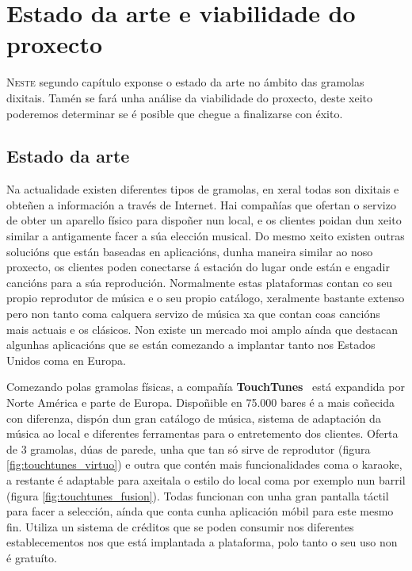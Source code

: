 \chapter{Estado da arte e viabilidade do proxecto}
\label{chap:arte_viabilidade}

\lettrine{N}{este} segundo capítulo exponse o estado da arte no ámbito das gramolas dixitais. Tamén se fará unha análise da viabilidade do proxecto, deste xeito poderemos determinar se é posible que chegue a finalizarse con éxito.

\section{Estado da arte}
\label{sec:estado_da_arte}
Na actualidade existen diferentes tipos de gramolas, en xeral todas son dixitais e obteñen a información a través de Internet. Hai compañías que ofertan o servizo de obter un aparello físico para dispoñer nun local, e os clientes poidan dun xeito similar a antigamente facer a súa elección musical. Do mesmo xeito existen outras solucións que están baseadas en aplicacións, dunha maneira similar ao noso proxecto, os clientes poden conectarse á estación do lugar onde están e engadir cancións para a súa reprodución. Normalmente estas plataformas contan co seu propio reprodutor de música e o seu propio catálogo, xeralmente bastante extenso pero non tanto coma calquera servizo de música xa que contan coas cancións mais actuais e os clásicos. Non existe un mercado moi amplo aínda que destacan algunhas aplicacións que se están comezando a implantar tanto nos Estados Unidos coma en Europa.\bigskip

Comezando polas gramolas físicas, a compañía \textbf{TouchTunes}~\cite{touchTunes} está expandida por Norte América e parte de Europa. Dispoñible en 75.000 bares é a mais coñecida con diferenza, dispón dun gran catálogo de música, sistema de adaptación da música ao local e diferentes ferramentas para o entretemento dos clientes. Oferta de 3 gramolas, dúas de parede, unha que tan só sirve de reprodutor (figura \ref{fig:touchtunes_virtuo}) e outra que contén mais funcionalidades coma o karaoke, a restante é adaptable para axeitala o estilo do local coma por exemplo nun barril (figura \ref{fig:touchtunes_fusion}). Todas funcionan con unha gran pantalla táctil para facer a selección, aínda que conta cunha aplicación móbil para este mesmo fin. Utiliza un sistema de créditos que se poden consumir nos diferentes establecementos nos que está implantada a plataforma, polo tanto o seu uso non é gratuíto.


